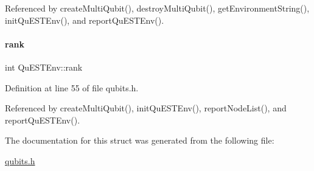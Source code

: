 Referenced by create\+Multi\+Qubit(), destroy\+Multi\+Qubit(), get\+Environment\+String(), init\+Qu\+E\+S\+T\+Env(), and report\+Qu\+E\+S\+T\+Env().

\mbox{\label{structQuESTEnv_aa648bb336cf8598467cb62db00b9cee8}} 
\paragraph{\texorpdfstring{rank}{rank}}
{\footnotesize\ttfamily int Qu\+E\+S\+T\+Env\+::rank}



Definition at line 55 of file qubits.\+h.



Referenced by create\+Multi\+Qubit(), init\+Qu\+E\+S\+T\+Env(), report\+Node\+List(), and report\+Qu\+E\+S\+T\+Env().



The documentation for this struct was generated from the following file\+:\begin{DoxyCompactItemize}
\item 
\hyperlink{qubits_8h}{qubits.\+h}\end{DoxyCompactItemize}
